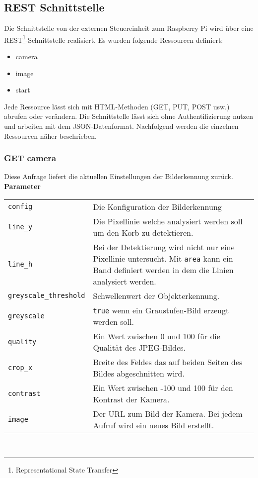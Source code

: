 \subsection{REST Schnittstelle}

Die Schnittstelle von der externen Steuereinheit zum Raspberry Pi wird über eine REST\footnote{Representational State Transfer}-Schnittstelle realisiert. Es wurden folgende Ressourcen definiert:
\begin{itemize}
	\item camera
	\item image
	\item start
\end{itemize}
Jede Ressource lässt sich mit HTML-Methoden (GET, PUT, POST usw.) abrufen oder verändern. Die Schnittstelle lässt sich ohne Authentifizierung nutzen und arbeiten mit dem JSON-Datenformat. Nachfolgend werden die einzelnen Ressourcen näher beschrieben.

\subsubsection{GET camera}

Diese Anfrage liefert die aktuellen Einstellungen der Bilderkennung zurück.\\

\textbf{Parameter}


\begin{tabular}{l p{16cm}}
	\texttt{config} & Die Konfiguration der Bilderkennung \\
	\texttt{line\_y} & Die Pixellinie welche analysiert werden soll um den Korb zu detektieren. \\
	\texttt{line\_h} & Bei der Detektierung wird nicht nur eine Pixellinie untersucht. Mit \texttt{area} kann ein Band definiert werden in dem die Linien analysiert werden. \\
	\texttt{greyscale\_threshold} & Schwellenwert der Objekterkennung. \\
	\texttt{greyscale} & \texttt{true} wenn ein Graustufen-Bild erzeugt werden soll. \\
	\texttt{quality} & Ein Wert zwischen 0 und 100 für die Qualität des JPEG-Bildes. \\
	\texttt{crop\_x} & Breite des Feldes das auf beiden Seiten des Bildes abgeschnitten wird. \\
	\texttt{contrast} & Ein Wert zwischen -100 und 100 für den Kontrast der Kamera. \\
	\texttt{image} & Der URL zum Bild der Kamera. Bei jedem Aufruf wird ein neues Bild erstellt.
\end{tabular}\\


